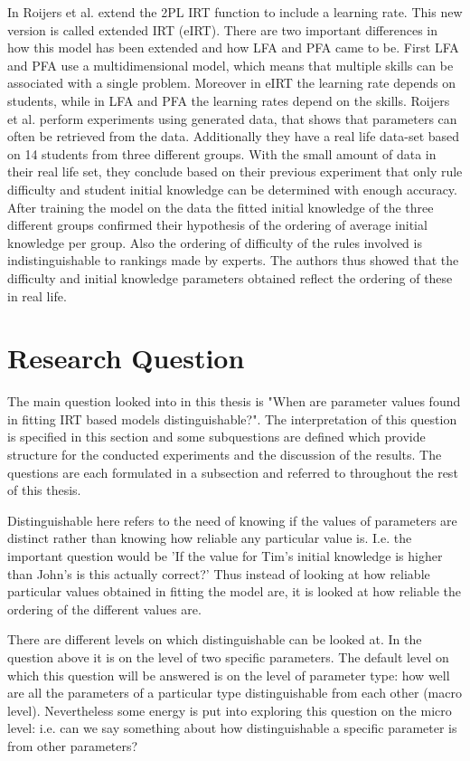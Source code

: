 \documentclass{scrartcl}
\begin{document}
In \cite{eirt} Roijers et al. extend the 2PL IRT function to include a learning rate. This new version is called extended IRT (eIRT). There are two important differences in how this model has been extended and how LFA and PFA came to be. First LFA and PFA use a multidimensional model, which means that multiple skills can be associated with a single problem. Moreover in eIRT the learning rate depends on students, while in LFA and PFA the learning rates depend on the skills. Roijers et al. perform experiments using generated data, that shows that parameters can often be retrieved from the data. Additionally they have a real life data-set based on 14 students from three different groups. With the small amount of data in their real life set, they conclude based on their previous experiment that only rule difficulty and student initial knowledge can be determined with enough accuracy. After training the model on the data the fitted initial knowledge of the three different groups confirmed their hypothesis of the ordering of average initial knowledge per group. Also the ordering of difficulty of the rules involved is indistinguishable to rankings made by experts. The authors thus showed that the difficulty and initial knowledge parameters obtained reflect the ordering of these in real life.


\section{Research Question}
\label{sec:RQ}
The main question looked into in this thesis is "When are parameter values found in fitting IRT based models distinguishable?". The interpretation of this question is specified in this section and some subquestions are defined which provide structure for the conducted experiments and the discussion of the results. The questions are each formulated in a subsection and referred to throughout the rest of this thesis.

Distinguishable here refers to the need of knowing if the values of parameters are distinct rather than knowing how reliable any particular value is. I.e. the important question would be 'If the value for Tim's initial knowledge is higher than John's is this actually correct?' Thus instead of looking at how reliable particular values obtained in fitting the model are, it is looked at how reliable the ordering of the different values are.

There are different levels on which distinguishable can be looked at. In the question above it is on the level of two specific parameters. The default level on which this question will be answered is on the level of parameter type: how well are all the parameters of a particular type distinguishable from each other (macro level). Nevertheless some energy is put into exploring this question on the micro level: i.e. can we say something about how distinguishable a specific parameter is from other parameters?
\end{document}
